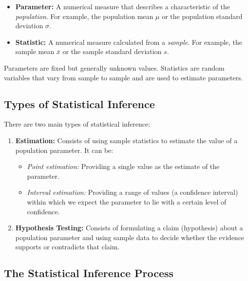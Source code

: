 \begin{definicion}
	\begin{itemize}
		\item \textbf{Parameter:} A numerical measure that describes a characteristic of the \emph{population}. For example, the population mean $\mu$ or the population standard deviation $\sigma$.
		\item \textbf{Statistic:} A numerical measure calculated from a \emph{sample}. For example, the sample mean $\bar{x}$ or the sample standard deviation $s$.
	\end{itemize}
\end{definicion}

\begin{observacion}
	Parameters are fixed but generally unknown values. Statistics are random variables that vary from sample to sample and are used to estimate parameters.
\end{observacion}

\subsection*{Types of Statistical Inference}

There are two main types of statistical inference:

\begin{enumerate}
	\item \textbf{Estimation:} Consists of using sample statistics to estimate the value of a population parameter. It can be:
	\begin{itemize}
		\item \emph{Point estimation:} Providing a single value as the estimate of the parameter.
		\item \emph{Interval estimation:} Providing a range of values (a confidence interval) within which we expect the parameter to lie with a certain level of confidence.
	\end{itemize}
	
	\item \textbf{Hypothesis Testing:} Consists of formulating a claim (hypothesis) about a population parameter and using sample data to decide whether the evidence supports or contradicts that claim.
\end{enumerate}

\subsection*{The Statistical Inference Process}

